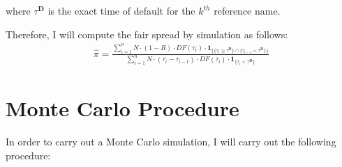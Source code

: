 \documentclass{report}
\theoremstyle{plain}
\theoremstyle{definition}
\begin{document}
where $\tau^{\mathbf{D}}$ is the exact time of default for the $k^{th}$ reference name.

Therefore, I will compute the fair spread by simulation as follows: 
\begin{align*}
\hat{\pi} = \frac{\sum_{i=1}^{n} N \cdot (1-R) \cdot DF(\tau_i) \cdot \mathbf{1}_{\{\{\tau_i \geq \tau^{\mathbf{D}}\} \cap \{\tau_{i-1} < \tau^{\mathbf{D}} \}\}}}{\sum_{i=1}^{n} N \cdot (\tau_i - \tau_{i-1}) \cdot DF(\tau_i) \cdot \mathbf{1}_{\{\tau_i < \tau^{\mathbf{D}} \}}}
\end{align*}

\section{Monte Carlo Procedure}
In order to carry out a Monte Carlo simulation, I will carry out the following procedure: 
\end{document}
